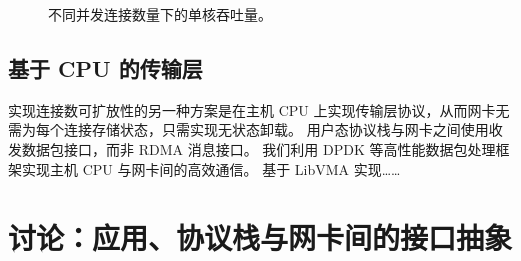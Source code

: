 \begin{figure}[htbp]
	\centering
	
	\caption{不同并发连接数量下的单核吞吐量。}
	\label{socksdirect:fig:eval-connnum-tput}
\end{figure}


\subsection{基于 CPU 的传输层}

实现连接数可扩放性的另一种方案是在主机 CPU 上实现传输层协议，从而网卡无需为每个连接存储状态，只需实现无状态卸载。
用户态协议栈与网卡之间使用收发数据包接口，而非 RDMA 消息接口。
我们利用 DPDK 等高性能数据包处理框架实现主机 CPU 与网卡间的高效通信。
基于 LibVMA 实现……









\section{讨论：应用、协议栈与网卡间的接口抽象}
\label{socksdirect:sec:api-discussion}

